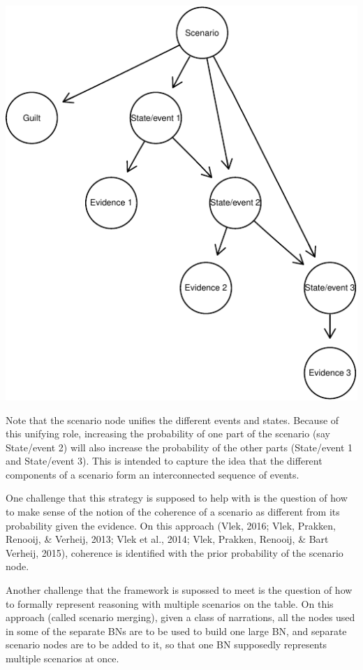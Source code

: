 \documentclass[11pt,dvipsnames,enabledeprecatedfontcommands]{scrartcl}
\begin{document}
\begin{center}\includegraphics{BNfiles/unnamed-chunk-13-1} \end{center}

\noindent Note that the scenario node unifies the different events and
states. Because of this unifying role, increasing the probability of one
part of the scenario (say \textsf{State/event 2}) will also increase the
probability of the other parts (\textsf{State/event 1} and
\textsf{State/event 3}). This is intended to capture the idea that the
different components of a scenario form an interconnected sequence of
events.

One challenge that this strategy is supposed to help with is the
question of how to make sense of the notion of the coherence of a
scenario as different from its probability given the evidence. On this
approach (Vlek, 2016; Vlek, Prakken, Renooij, \& Verheij, 2013; Vlek et
al., 2014; Vlek, Prakken, Renooij, \& Bart Verheij, 2015), coherence is
identified with the prior probability of the scenario node.

Another challenge that the framework is supossed to meet is the question
of how to formally represent reasoning with multiple scenarios on the
table. On this approach (called scenario merging), given a class of
narrations, all the nodes used in some of the separate BNs are to be
used to build one large BN, and separate scenario nodes are to be added
to it, so that one BN supposedly represents multiple scenarios at once.
\end{document}
